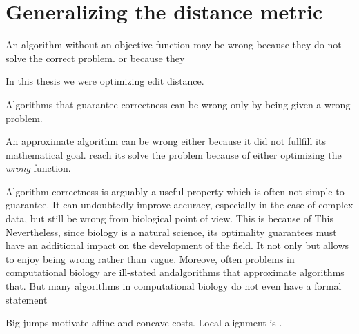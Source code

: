 \section{Generalizing the distance metric}

An algorithm without an objective function may be wrong because they do not
solve the correct problem. or because they 

In this thesis we were optimizing edit distance. 

Algorithms that guarantee correctness can be wrong only by being given a wrong problem.

An approximate algorithm can be wrong either because it did not fullfill its
mathematical goal. reach its solve the problem because of either optimizing the
\emph{wrong} function.

Algorithm correctness is arguably a useful property which is often not simple to
guarantee. It can undoubtedly improve accuracy, especially in the case of
complex data, but still be wrong from biological point of view. This is because
of  This Nevertheless, since biology is a natural science, its  optimality
guarantees must have an additional impact on the development of the field. It
not only but allows to enjoy being wrong rather than vague. Moreove, often
problems in computational biology are ill-stated andalgorithms that approximate
algorithms that. But many algorithms in computational biology do not even have a
formal statement 

Big jumps motivate affine and concave costs. Local alignment is
\cite{arslan2001new}.